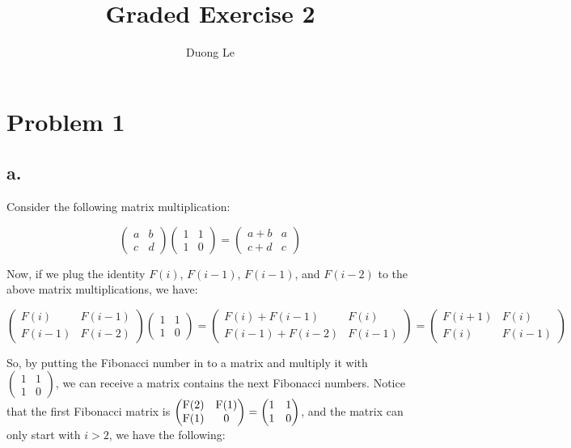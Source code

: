 \documentclass{article}
\title{Graded Exercise 2}
\author{Duong Le}
\date{}
\begin{document}
\maketitle

\section*{Problem 1}
\subsection*{a.}
Consider the following matrix multiplication:

\[
\begin{pmatrix} a & b \\ c & d \end{pmatrix}
\begin{pmatrix} 1 & 1 \\ 1 & 0 \end{pmatrix}
=
\begin{pmatrix} a + b & a \\ c + d & c \end{pmatrix}
\]

Now, if we plug the identity ${F(i)}$, ${F(i-1)}$, ${F(i-1)}$, and ${F(i-2)}$ to the above matrix multiplications, we have: 

\[
\begin{pmatrix} F(i) & F(i-1) \\ F(i-1) & F(i-2) \end{pmatrix}
\begin{pmatrix} 1 & 1 \\ 1 & 0 \end{pmatrix}
= \begin{pmatrix} F(i) + F(i-1) & F(i) \\ F(i-1) + F(i-2) & F(i-1) \end{pmatrix}
= \begin{pmatrix} F(i+1) & F(i) \\ F(i) & F(i-1) \end{pmatrix}
\]

So, by putting the Fibonacci number in to a matrix and multiply it with ${\begin{pmatrix} 1 & 1 \\ 1 & 0 \end{pmatrix}}$, we can receive a matrix contains the next Fibonacci numbers. Notice that the first Fibonacci matrix is ${\begin{pmatrix} ${F(2)}$ & ${F(1)}$ \\ ${F(1)}$ & 0 \end{pmatrix} = \begin{pmatrix} 1 & 1 \\ 1 & 0 \end{pmatrix}}$, and the matrix can only start with ${i > 2}$, we have the following:
\end{document}
